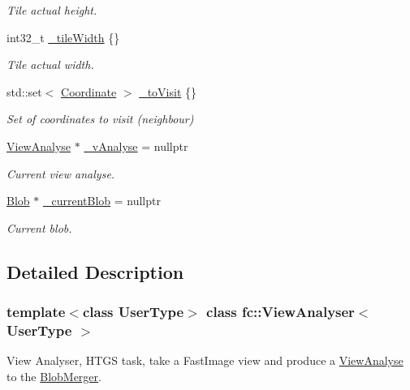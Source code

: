 \begin{DoxyCompactItemize}
\begin{DoxyCompactList}\small\item\em Tile actual height. \end{DoxyCompactList}\item 
int32\+\_\+t \hyperlink{classfc_1_1ViewAnalyser_a59d87a42c4e6e38be83e83f56d8e5fc4}{\+\_\+tile\+Width} \{\}
\begin{DoxyCompactList}\small\item\em Tile actual width. \end{DoxyCompactList}\item 
std\+::set$<$ \hyperlink{namespacefc_a7da125cb1e99553c27c07139ee8a62ca}{Coordinate} $>$ \hyperlink{classfc_1_1ViewAnalyser_aa7728b7f80b1eca4b8d9fc726d205a8e}{\+\_\+to\+Visit} \{\}
\begin{DoxyCompactList}\small\item\em Set of coordinates to visit (neighbour) \end{DoxyCompactList}\item 
\hyperlink{classfc_1_1ViewAnalyse}{View\+Analyse} $\ast$ \hyperlink{classfc_1_1ViewAnalyser_acdf4a2e6d98308f6bff77dba12ea1cc1}{\+\_\+v\+Analyse} = nullptr
\begin{DoxyCompactList}\small\item\em Current view analyse. \end{DoxyCompactList}\item 
\hyperlink{classfc_1_1Blob}{Blob} $\ast$ \hyperlink{classfc_1_1ViewAnalyser_abfab9f8db5a08141b1ae611bfecc3e3c}{\+\_\+current\+Blob} = nullptr
\begin{DoxyCompactList}\small\item\em Current blob. \end{DoxyCompactList}\end{DoxyCompactItemize}


\subsection{Detailed Description}
\subsubsection*{template$<$class User\+Type$>$\newline
class fc\+::\+View\+Analyser$<$ User\+Type $>$}

View Analyser, H\+T\+GS task, take a Fast\+Image view and produce a \hyperlink{classfc_1_1ViewAnalyse}{View\+Analyse} to the \hyperlink{classfc_1_1BlobMerger}{Blob\+Merger}. 

